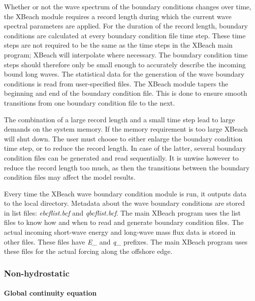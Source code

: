 \documentclass{article}
\begin{document}
\noindent Whether or not the wave spectrum of the boundary conditions changes over time, the XBeach module requires a record length during which the current wave spectral parameters are applied. For the duration of the record length, boundary conditions are calculated at every boundary condition file time step. These time steps are not required to be the same as the time steps in the XBeach main program; XBeach will interpolate where necessary. The boundary condition time steps should therefore only be small enough to accurately describe the incoming bound long waves. The statistical data for the generation of the wave boundary conditions is read from user-specified files. The XBeach module tapers the beginning and end of the boundary condition file. This is done to ensure smooth transitions from one boundary condition file to the next.

\noindent The combination of a large record length and a small time step lead to large demands on the system memory. If the memory requirement is too large XBeach will shut down. The user must choose to either enlarge the boundary condition time step, or to reduce the record length. In case of the latter, several boundary condition files can be generated and read sequentially. It is unwise however to reduce the record length too much, as then the transitions between the boundary condition files may affect the model results.

\noindent Every time the XBeach wave boundary condition module is run, it outputs data to the local directory. Metadata about the wave boundary conditions are stored in list files: \textit{ebcflist.bcf} and \textit{qbcflist.bcf}. The main XBeach program uses the list files to know how and when to read and generate boundary condition files. The actual incoming short-wave energy and long-wave mass flux data is stored in other files. These files have \textit{E\_} and \textit{q\_} prefixes. The main XBeach program uses these files for the actual forcing along the offshore edge.

\noindent \eject 


\subsubsection{ Non-hydrostatic}


\paragraph{ Global continuity equation}
\end{document}
